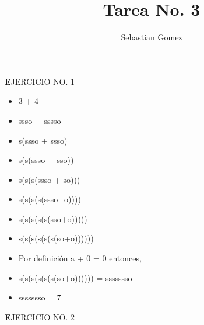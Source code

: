 \documentclass{article}
\begin{document}
\title{\textbf {Tarea No. 3}}
\author{Sebastian Gomez}
\maketitle
\newline
\begin{center}
\textbf EJERCICIO NO. 1
\end{center}
\begin{itemize}
\item 3 + 4
\item ssso + sssso
\item s(ssso + ssso)
\item s(s(ssso + sso))
\item s(s(s(ssso + so)))
\item s(s(s(s(ssso+o))))
\item s(s(s(s(s(sso+o)))))
\item s(s(s(s(s(s(so+o)))))) 
\item Por definición a + 0 = 0 entonces, 
\item s(s(s(s(s(s(so+o)))))) = ssssssso
\item ssssssso = 7
\end{itemize}
\newline
\begin{center}
\textbf EJERCICIO NO. 2
\end{center}
\end{document}
